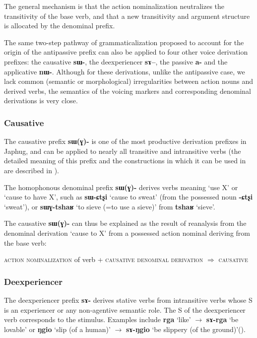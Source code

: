 \documentclass[oldfontcommands,oneside,a4paper,11pt]{article}
\newcommand{\ipa}[1]{\mbox{\phon\textbf{#1}}} %
\begin{document}
The general mechanism is that the action nominalization neutralizes the transitivity of the base verb, and that a new transitivity and argument structure is allocated by the denominal prefix.

 The same two-step pathway of grammaticalization proposed to account for the origin of the antipassive prefix can also be applied to four other voice derivation prefixes: the causative \ipa{sɯ-}, the deexperiencer \ipa{sɤ--}, the passive \ipa{a-} and the applicative \ipa{nɯ-}. Although for these derivations, unlike the antipassive case, we lack common (semantic or morphological) irregularities between action nouns and derived verbs, the semantics of the voicing markers and corresponding denominal derivations is very close.

\subsubsection{Causative}  \label{sec:causative}
The causative prefix \ipa{sɯ(ɣ)-} is one of the most productive derivation prefixes in Japhug, and can be applied to nearly all transitive and intransitive verbs (the detailed meaning of this prefix and the constructions in which it can be used in are described in \citealt{jacques15causative}). 

 The homophonous denominal prefix \ipa{sɯ(ɣ)-} derives verbs meaning `use X' or `cause to have X', such as \ipa{sɯ-ɕtʂi} `cause to sweat' (from the possessed noun \ipa{-ɕtʂi} `sweat'), or \ipa{sɯɣ-tshaʁ} `to sieve (=to use a sieve)' from \ipa{tshaʁ} `sieve'. 

The causative \ipa{sɯ(ɣ)-} can thus be explained as the result of reanalysis from the denominal derivation `cause to X' from a possessed action nominal deriving from the base verb:

\begin{exe}
\ex \label{ex:pathway2}
\glt \textsc{action nominalization} of verb + \textsc{causative denominal derivation} $\Rightarrow$ \textsc{causative}
\end{exe} 

 


\subsubsection{Deexperiencer} \label{sec:deexp}
 
 The deexperiencer prefix \ipa{sɤ-} derives stative verbs from intransitive verbs whose S is an experiencer or any non-agentive semantic role. The S of the deexperiencer verb corresponds to the stimulus. Examples include \ipa{rga} `like' $\rightarrow$ \ipa{sɤ-rga} `be lovable' or \ipa{ŋgio} `slip (of a human)' $\rightarrow$ \ipa{sɤ-ŋgio} `be slippery (of the ground)'(\citealt{jacques12demotion}).
\end{document}
